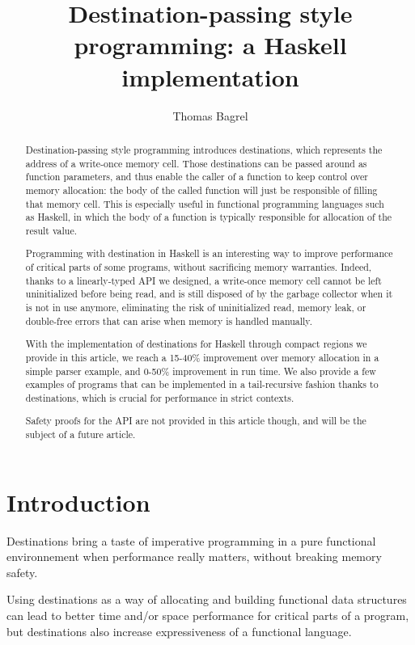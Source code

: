 \documentclass[english]{jflart}
\title{Destination-passing style programming: a Haskell implementation}
\author[1]{Thomas Bagrel}
\affil[1]{INRIA/LORIA, Vand\oe{}uvre-lès-Nancy, 54500, France}
\affil[2]{TWEAG, Paris, 75012, France}
\begin{document}
\maketitle

\begin{abstract}
Destination-passing style programming introduces destinations, which represents the address of a write-once memory cell. Those destinations can be passed around as function parameters, and thus enable the caller of a function to keep control over memory allocation: the body of the called function will just be responsible of filling that memory cell. This is especially useful in functional programming languages such as Haskell, in which the body of a function is typically responsible for allocation of the result value.

Programming with destination in Haskell is an interesting way to improve performance of critical parts of some programs, without sacrificing memory warranties. Indeed, thanks to a linearly-typed API we designed, a write-once memory cell cannot be left uninitialized before being read, and is still disposed of by the garbage collector when it is not in use anymore, eliminating the risk of uninitialized read, memory leak, or double-free errors that can arise when memory is handled manually.

With the implementation of destinations for Haskell through compact regions we provide in this article, we reach a 15-40\% improvement over memory allocation in a simple parser example, and 0-50\% improvement in run time. We also provide a few examples of programs that can be implemented in a tail-recursive fashion thanks to destinations, which is crucial for performance in strict contexts.

Safety proofs for the API are not provided in this article though, and will be the subject of a future article.
\end{abstract}

\tableofcontents{}

\section{Introduction}


Destinations bring a taste of imperative programming in a pure functional environnement when performance really matters, without breaking memory safety.

Using destinations as a way of allocating and building functional data structures can lead to better time and/or space performance for critical parts of a program, but destinations also increase expressiveness of a functional language.
\end{document}
